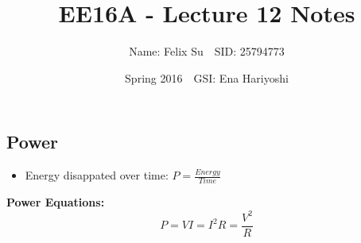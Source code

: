 \documentclass{article}\usepackage{amsmath,amssymb,amsthm,tikz,tkz-graph,color,chngpage,soul,hyperref,csquotes,graphicx,floatrow}\newcommand*{\QEDB}{\hfill\ensuremath{\square}}\newtheorem*{prop}{Proposition}\renewcommand{\theenumi}{\alph{enumi}}\usepackage[shortlabels]{enumitem}\usepackage[nobreak=true]{mdframed}\usetikzlibrary{matrix,calc}\MakeOuterQuote{"}\usepackage[margin=0.75in]{geometry} \newtheorem{theorem}{Theorem}
\title{EE16A - Lecture 12 Notes}
\author{Name: Felix Su$\quad$SID: 25794773}
\date{Spring 2016$\quad$GSI: Ena Hariyoshi}
\begin{document}
\maketitle

\subsection*{Power}
\begin{itemize}
\item Energy disappated over time: $P = \frac{Energy}{Time}$
\end{itemize}
\begin{mdframed}
\textbf{Power Equations:}\\
\begin{equation}P = VI = I^2R=\frac{V^2}{R}\end{equation}
\end{mdframed}

\end{document}
